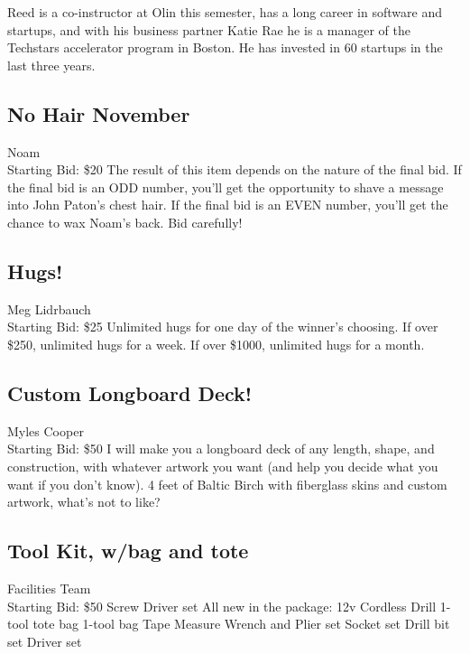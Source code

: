 \documentclass[11pt]{article}
\begin{document}
Reed is a co-instructor at Olin this semester, has a long career in software and startups, and with his business partner Katie Rae he is a manager of the Techstars accelerator program in Boston. He has invested in 60 startups in the last three years.
\subsection{No Hair November}
Noam
\\
Starting Bid: \$20
\newline
The result of this item depends on the nature of the final bid.
If the final bid is an ODD number, you'll get the opportunity to shave a message into John Paton's chest hair.
If the final bid is an EVEN number, you'll get the chance to wax Noam's back.
Bid carefully!
\subsection{Hugs!}
Meg Lidrbauch
\\
Starting Bid: \$25
\newline
Unlimited hugs for one day of the winner's choosing. If over \$250, unlimited hugs for a week. If over \$1000, unlimited hugs for a month.
\subsection{Custom Longboard Deck!}
Myles Cooper
\\
Starting Bid: \$50
\newline
I will make you a longboard deck of any length, shape, and construction, with whatever artwork you want (and help you decide what you want if you don't know). 4 feet of Baltic Birch with fiberglass skins and custom artwork, what's not to like?
\subsection{Tool Kit, w/bag and tote}
Facilities Team
\\
Starting Bid: \$50
\newline
Screw Driver set
All new in the package:
12v Cordless Drill
1- tool tote bag
1-tool bag
Tape Measure
Wrench and Plier set
Socket set
Drill bit set
Driver set
\end{document}
